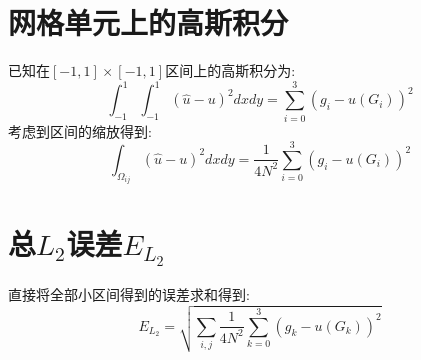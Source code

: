 \documentclass[UTF8]{ctexart}
\begin{document}
    \section{网格单元上的高斯积分}
        \indent 已知在$[-1,1]\times[-1,1]$区间上的高斯积分为:
        \begin{equation}
            \int_{-1}^1\int_{-1}^1(\hat{u}-u)^2dxdy=\sum\limits_{i=0}^3(g_i-u(G_i))^2
        \end{equation}
        考虑到区间的缩放得到:
        \begin{equation}
            \int_{\Omega_{ij}}(\hat{u}-u)^2dxdy=\dfrac{1}{4N^2}\sum\limits_{i=0}^3(g_i-u(G_i))^2
        \end{equation}
    \section{总$L_2$误差$E_{L_2}$}
        \indent 直接将全部小区间得到的误差求和得到:
        \begin{equation}
            E_{L_2}=\sqrt{\sum\limits_{i,j}\dfrac{1}{4N^2}\sum\limits_{k=0}^3(g_k-u(G_k))^2}
        \end{equation}
\end{document}
